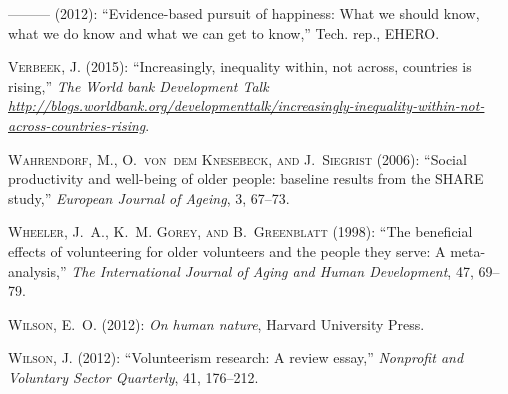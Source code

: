 ---\hspace{-.1pt}---\hspace{-.1pt}--- (2012): \enquote{Evidence-based pursuit
  of happiness: What we should know, what we do know and what we can get to
  know,} Tech. rep., EHERO.

\textsc{Verbeek, J.} (2015): \enquote{Increasingly, inequality within, not
  across, countries is rising,} \emph{The World bank Development Talk
  \url{http://blogs.worldbank.org/developmenttalk/increasingly-inequality-within-not-across-countries-rising}}.

\textsc{Wahrendorf, M., O.~von~dem Knesebeck, and J.~Siegrist} (2006):
  \enquote{Social productivity and well-being of older people: baseline results
  from the SHARE study,} \emph{European Journal of Ageing}, 3, 67--73.

\textsc{Wheeler, J.~A., K.~M. Gorey, and B.~Greenblatt} (1998): \enquote{The
  beneficial effects of volunteering for older volunteers and the people they
  serve: A meta-analysis,} \emph{The International Journal of Aging and Human
  Development}, 47, 69--79.

\textsc{Wilson, E.~O.} (2012{}): \emph{On human nature}, Harvard
  University Press.

\textsc{Wilson, J.} (2012{}): \enquote{Volunteerism research: A
  review essay,} \emph{Nonprofit and Voluntary Sector Quarterly}, 41, 176--212.